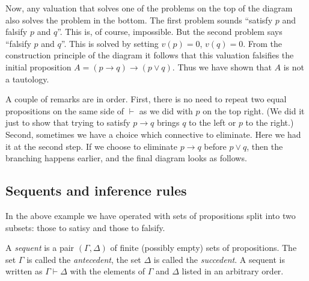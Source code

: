 \begin{page}
Now, any valuation that solves one of the problems on the top of the diagram also solves the problem in the bottom.
The first problem sounds ``satisfy $p$ and falsify $p$ and $q$''.
This is, of course, impossible.
But the second problem says ``falsify $p$ and $q$''.
This is solved by setting $v(p) = 0$, $v(q) = 0$.
From the construction principle of the diagram it follows that this valuation falsifies the initial proposition $A = (p \to q) \to (p \vee q)$.
Thus we have shown that $A$ is not a tautology.

A couple of remarks are in order.
First, there is no need to repeat two equal propositions on the same side of $\vdash$ as we did with $p$ on the top right.
(We did it just to show that trying to satisfy $p \to q$ brings $q$ to the left or $p$ to the right.)
Second, sometimes we have a choice which connective to eliminate.
Here we had it at the second step.
If we choose to eliminate $p \to q$ before $p \vee q$, then the branching happens earlier, and the final diagram looks as follows.
\begin{prooftree}
\end{prooftree}




\end{page}

\begin{page}
\setcounter{section}{2}
\setcounter{subsection}{4}
\setcounter{dfn}{5}
\label{portion:497}

\subsection{Sequents and inference rules}
In the above example we have operated with sets of propositions split into two subsets: those to satisy and those to falsify.

\end{page}

\begin{page}
\setcounter{section}{2}
\setcounter{subsection}{4}
\setcounter{dfn}{6}
\label{portion:499}

\begin{dfn}
A \emph{sequent} is a pair $(\Gamma, \Delta)$ of finite (possibly empty) sets of propositions.
The set $\Gamma$ is called the \emph{antecedent}, the set $\Delta$ is called the \emph{succedent}.
A sequent is written as $\Gamma \vdash \Delta$ with the elements of $\Gamma$ and $\Delta$ listed in an arbitrary order.
\end{dfn}

\end{page}

